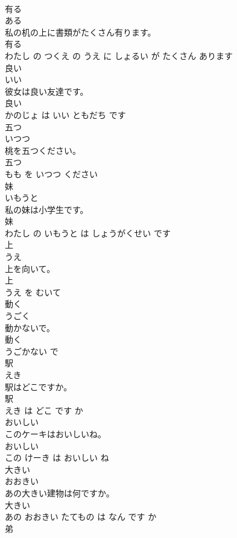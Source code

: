 \documentclass[8pt]{extreport}
\begin{document}
\begin{CJK}{UTF8}{min}
\\	有る	
\\	ある			
\\	私の机の上に書類がたくさん有ります。	
\\	有る 
\\	わたし の つくえ の うえ に しょるい が たくさん あります			
\\	良い	
\\	いい			
\\	彼女は良い友達です。	
\\	良い 
\\	かのじょ は いい ともだち です			
\\	五つ	
\\	いつつ			
\\	桃を五つください。	
\\	五つ 
\\	もも を いつつ ください			
\\	妹	
\\	いもうと			
\\	私の妹は小学生です。	
\\	妹 
\\	わたし の いもうと は しょうがくせい です			
\\	上	
\\	うえ			
\\	上を向いて。	
\\	上 
\\	うえ を むいて			
\\	動く	
\\	うごく			
\\	動かないで。	
\\	動く 
\\	うごかない で			
\\	駅	
\\	えき			
\\	駅はどこですか。	
\\	駅 
\\	えき は どこ です か			
\\	おいしい	
\\	このケーキはおいしいね。	
\\	おいしい 
\\	この けーき は おいしい ね			
\\	大きい	
\\	おおきい			
\\	あの大きい建物は何ですか。	
\\	大きい 
\\	あの おおきい たてもの は なん です か			
\\	弟	

\end{CJK}
\end{document}
